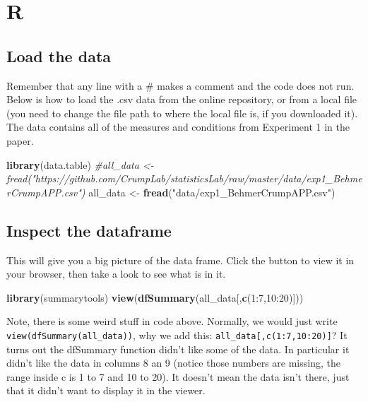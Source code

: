\documentclass[]{book}
\newenvironment{Shaded}{\begin{snugshade}}{\end{snugshade}}
\newcommand{\KeywordTok}[1]{\textcolor[rgb]{0.13,0.29,0.53}{\textbf{{#1}}}}
\newcommand{\DecValTok}[1]{\textcolor[rgb]{0.00,0.00,0.81}{{#1}}}
\newcommand{\StringTok}[1]{\textcolor[rgb]{0.31,0.60,0.02}{{#1}}}
\newcommand{\CommentTok}[1]{\textcolor[rgb]{0.56,0.35,0.01}{\textit{{#1}}}}
\newcommand{\NormalTok}[1]{{#1}}
\theoremstyle{definition}
\theoremstyle{definition}
\theoremstyle{definition}
\theoremstyle{remark}
\begin{document}
\section{R}\label{r-9}

\subsection{Load the data}\label{load-the-data-3}

Remember that any line with a \# makes a comment and the code does not
run. Below is how to load the .csv data from the online repository, or
from a local file (you need to change the file path to where the local
file is, if you downloaded it). The data contains all of the measures
and conditions from Experiment 1 in the paper.

\begin{Shaded}
\begin{Highlighting}[]
\KeywordTok{library}\NormalTok{(data.table)}
\CommentTok{#all_data <- fread("https://github.com/CrumpLab/statisticsLab/raw/master/data/exp1_BehmerCrumpAPP.csv")}
\NormalTok{all_data <-}\StringTok{ }\KeywordTok{fread}\NormalTok{(}\StringTok{"data/exp1_BehmerCrumpAPP.csv"}\NormalTok{)}
\end{Highlighting}
\end{Shaded}

\subsection{Inspect the dataframe}\label{inspect-the-dataframe-1}

This will give you a big picture of the data frame. Click the button to
view it in your browser, then take a look to see what is in it.

\begin{Shaded}
\begin{Highlighting}[]
\KeywordTok{library}\NormalTok{(summarytools)}
\KeywordTok{view}\NormalTok{(}\KeywordTok{dfSummary}\NormalTok{(all_data[,}\KeywordTok{c}\NormalTok{(}\DecValTok{1}\NormalTok{:}\DecValTok{7}\NormalTok{,}\DecValTok{10}\NormalTok{:}\DecValTok{20}\NormalTok{)]))}
\end{Highlighting}
\end{Shaded}

Note, there is some weird stuff in code above. Normally, we would just
write \texttt{view(dfSummary(all\_data))}, why we add this:
\texttt{all\_data{[},c(1:7,10:20){]}}? It turns out the dfSummary
function didn't like some of the data. In particular it didn't like the
data in columns 8 an 9 (notice those numbers are missing, the range
inside c is 1 to 7 and 10 to 20). It doesn't mean the data isn't there,
just that it didn't want to display it in the viewer.
\end{document}
